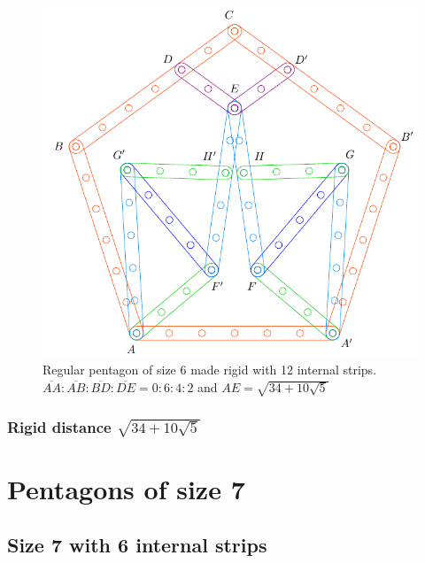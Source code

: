 \documentclass[11pt]{article}
\begin{document}
\begin{figure}[H]
\centering
\includegraphics[scale=0.7]{6/penta6-12a}
\caption{Regular pentagon of size 6 made rigid with 12 internal strips. $\overline{AA}:\overline{AB}:\overline{BD}:\overline{DE} = 0:6:4:2$ and $AE = \sqrt{34 + 10\sqrt5}$} 
\label{fig:penta6-12a}
\end{figure}

\subsubsection{Rigid distance $\sqrt{34 + 10\sqrt5}$}




\section{Pentagons of size 7}

\subsection{Size 7 with 6 internal strips}
\end{document}
